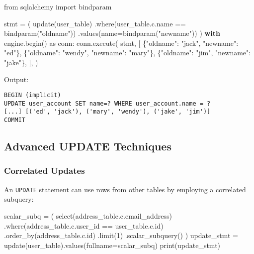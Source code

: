 \documentclass[
  letterpaper,
  DIV=11,
  numbers=noendperiod]{scrreprt}
\newenvironment{Shaded}{\begin{snugshade}}{\end{snugshade}}
\newcommand{\BuiltInTok}[1]{\textcolor[rgb]{0.00,0.23,0.31}{#1}}
\newcommand{\ControlFlowTok}[1]{\textcolor[rgb]{0.00,0.23,0.31}{\textbf{#1}}}
\newcommand{\DecValTok}[1]{\textcolor[rgb]{0.68,0.00,0.00}{#1}}
\newcommand{\ImportTok}[1]{\textcolor[rgb]{0.00,0.46,0.62}{#1}}
\newcommand{\NormalTok}[1]{\textcolor[rgb]{0.00,0.23,0.31}{#1}}
\newcommand{\OperatorTok}[1]{\textcolor[rgb]{0.37,0.37,0.37}{#1}}
\newcommand{\StringTok}[1]{\textcolor[rgb]{0.13,0.47,0.30}{#1}}
\begin{document}
\begin{Shaded}
\begin{Highlighting}[]
\ImportTok{from}\NormalTok{ sqlalchemy }\ImportTok{import}\NormalTok{ bindparam}

\NormalTok{stmt }\OperatorTok{=}\NormalTok{ (}
\NormalTok{    update(user\_table)}
\NormalTok{    .where(user\_table.c.name }\OperatorTok{==}\NormalTok{ bindparam(}\StringTok{"oldname"}\NormalTok{))}
\NormalTok{    .values(name}\OperatorTok{=}\NormalTok{bindparam(}\StringTok{"newname"}\NormalTok{))}
\NormalTok{)}
\ControlFlowTok{with}\NormalTok{ engine.begin() }\ImportTok{as}\NormalTok{ conn:}
\NormalTok{    conn.execute(}
\NormalTok{        stmt,}
\NormalTok{        [}
\NormalTok{            \{}\StringTok{"oldname"}\NormalTok{: }\StringTok{"jack"}\NormalTok{, }\StringTok{"newname"}\NormalTok{: }\StringTok{"ed"}\NormalTok{\},}
\NormalTok{            \{}\StringTok{"oldname"}\NormalTok{: }\StringTok{"wendy"}\NormalTok{, }\StringTok{"newname"}\NormalTok{: }\StringTok{"mary"}\NormalTok{\},}
\NormalTok{            \{}\StringTok{"oldname"}\NormalTok{: }\StringTok{"jim"}\NormalTok{, }\StringTok{"newname"}\NormalTok{: }\StringTok{"jake"}\NormalTok{\},}
\NormalTok{        ],}
\NormalTok{    )}
\end{Highlighting}
\end{Shaded}

Output:

\begin{verbatim}
BEGIN (implicit)
UPDATE user_account SET name=? WHERE user_account.name = ?
[...] [('ed', 'jack'), ('mary', 'wendy'), ('jake', 'jim')]
COMMIT
\end{verbatim}

\subsection{Advanced UPDATE
Techniques}\label{advanced-update-techniques}

\subsubsection{Correlated Updates}\label{correlated-updates}

An \texttt{UPDATE} statement can use rows from other tables by employing
a correlated subquery:

\begin{Shaded}
\begin{Highlighting}[]
\NormalTok{scalar\_subq }\OperatorTok{=}\NormalTok{ (}
\NormalTok{    select(address\_table.c.email\_address)}
\NormalTok{    .where(address\_table.c.user\_id }\OperatorTok{==}\NormalTok{ user\_table.c.}\BuiltInTok{id}\NormalTok{)}
\NormalTok{    .order\_by(address\_table.c.}\BuiltInTok{id}\NormalTok{)}
\NormalTok{    .limit(}\DecValTok{1}\NormalTok{)}
\NormalTok{    .scalar\_subquery()}
\NormalTok{)}
\NormalTok{update\_stmt }\OperatorTok{=}\NormalTok{ update(user\_table).values(fullname}\OperatorTok{=}\NormalTok{scalar\_subq)}
\BuiltInTok{print}\NormalTok{(update\_stmt)}
\end{Highlighting}
\end{Shaded}
\end{document}
